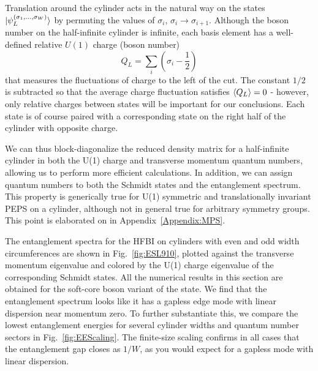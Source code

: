 Translation around the cylinder acts in the natural way on the states 
$\vert \psi_L^{(\sigma_1, \ldots, \sigma_W)} \rangle$ by permuting the values of 
$\sigma_i$, $\sigma_i \to \sigma_{i+1}$. 
Although the boson number on the half-infinite cylinder is infinite,
each basis element has a well-defined relative $U(1)$ charge (boson number)
$$Q_L = \sum_i (\sigma_i - \frac12)$$ that measures the fluctuations of charge
to the left of the cut. 
The constant $1/2$ is subtracted so that the average charge fluctuation
satisfies $\langle Q_L \rangle = 0$ - however, only relative charges between states will be 
important for our conclusions.
Each state is of course paired with a corresponding state
on the right half of the cylinder with opposite charge.

We can thus block-diagonalize the reduced density matrix
for a half-infinite cylinder in both the U(1) charge and transverse momentum
quantum numbers, allowing us to perform more efficient calculations. 
In addition, we can assign quantum numbers to both the Schmidt states and the entanglement
spectrum. This property is generically true for U(1) symmetric and translationally invariant PEPS
on a cylinder, although not in general true for arbitrary symmetry groups.
This point is elaborated on in Appendix~\ref{Appendix:MPS}.


The entanglement spectra for the HFBI on cylinders with even and odd width
circumferences are shown in Fig.~\ref{fig:ESL910}, plotted
against the transverse momentum eigenvalue and colored by the U(1) charge
eigenvalue of the corresponding Schmidt states. All the numerical results in this section
are obtained for the soft-core boson variant of the state.
We find that the entanglement spectrum looks like it has a gapless
edge mode with linear dispersion near momentum zero.
To further substantiate this, we compare the lowest entanglement energies
for several cylinder widths and quantum number sectors in Fig.~\ref{fig:EEScaling}.
The finite-size scaling confirms in all cases that
the entanglement gap closes as $1/W$, as you would expect for a gapless mode
with linear dispersion.


